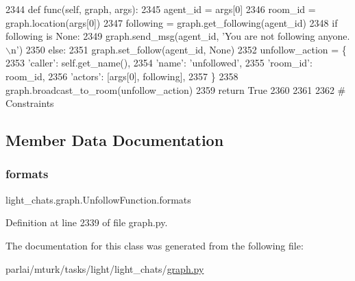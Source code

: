 \begin{DoxyCode}
2344     \textcolor{keyword}{def }func(self, graph, args):
2345         agent\_id = args[0]
2346         room\_id = graph.location(args[0])
2347         following = graph.get\_following(agent\_id)
2348         \textcolor{keywordflow}{if} following \textcolor{keywordflow}{is} \textcolor{keywordtype}{None}:
2349             graph.send\_msg(agent\_id, \textcolor{stringliteral}{'You are not following anyone.\(\backslash\)n'})
2350         \textcolor{keywordflow}{else}:
2351             graph.set\_follow(agent\_id, \textcolor{keywordtype}{None})
2352             unfollow\_action = \{
2353                 \textcolor{stringliteral}{'caller'}: self.get\_name(),
2354                 \textcolor{stringliteral}{'name'}: \textcolor{stringliteral}{'unfollowed'},
2355                 \textcolor{stringliteral}{'room\_id'}: room\_id,
2356                 \textcolor{stringliteral}{'actors'}: [args[0], following],
2357             \}
2358             graph.broadcast\_to\_room(unfollow\_action)
2359         \textcolor{keywordflow}{return} \textcolor{keyword}{True}
2360 
2361 
2362 \textcolor{comment}{# Constraints}
\end{DoxyCode}


\subsection{Member Data Documentation}
\mbox{\label{classlight__chats_1_1graph_1_1UnfollowFunction_a9b7464a052add385de3d685e1627fcf5}} 
\subsubsection{\texorpdfstring{formats}{formats}}
{\footnotesize\ttfamily light\+\_\+chats.\+graph.\+Unfollow\+Function.\+formats}



Definition at line 2339 of file graph.\+py.



The documentation for this class was generated from the following file\+:\begin{DoxyCompactItemize}
\item 
parlai/mturk/tasks/light/light\+\_\+chats/\hyperlink{parlai_2mturk_2tasks_2light_2light__chats_2graph_8py}{graph.\+py}\end{DoxyCompactItemize}
